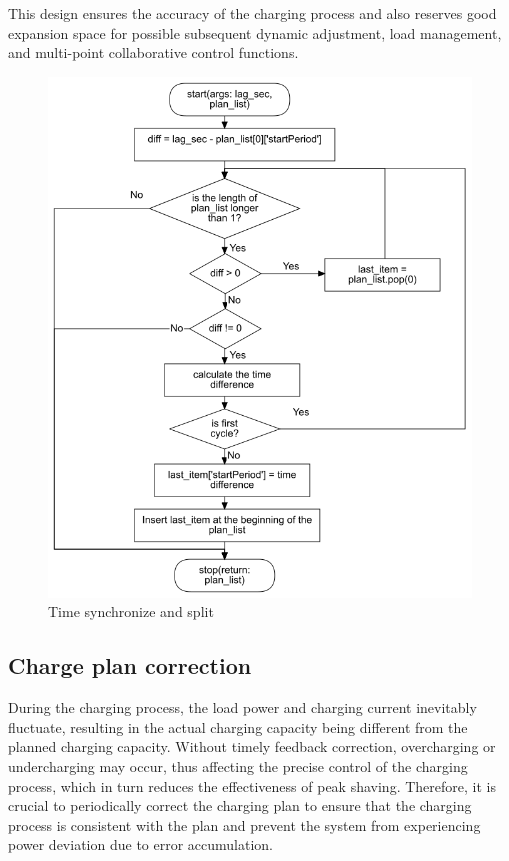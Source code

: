 \documentclass[
	english,
	ruledheaders=section,%
	class=report,%
	thesis={type=Report},%
	accentcolor=9c,%
	custommargins=true,%
	marginpar=false,%
	parskip=half-,%
	fontsize=11pt,%
	logofile={img/tuda_logo.pdf}, %
]{tudapub}
\begin{document}
This design ensures the accuracy of the charging process and also reserves good expansion space for possible subsequent dynamic adjustment, load management, and multi-point collaborative control functions.
\begin{figure}[H]
    \centering
    \includegraphics[width=0.7\linewidth]{img/PlanCutting.png}
    \caption{Time synchronize and split}
    \label{fig:planCutting}
\end{figure}


\subsection{Charge plan correction}
\label{subsec: chargePlanCorrection}

During the charging process, the load power and charging current inevitably fluctuate, resulting in the actual charging capacity being different from the planned charging capacity. Without timely feedback correction, overcharging or undercharging may occur, thus affecting the precise control of the charging process, which in turn reduces the effectiveness of peak shaving. Therefore, it is crucial to periodically correct the charging plan to ensure that the charging process is consistent with the plan and prevent the system from experiencing power deviation due to error accumulation.
\end{document}
